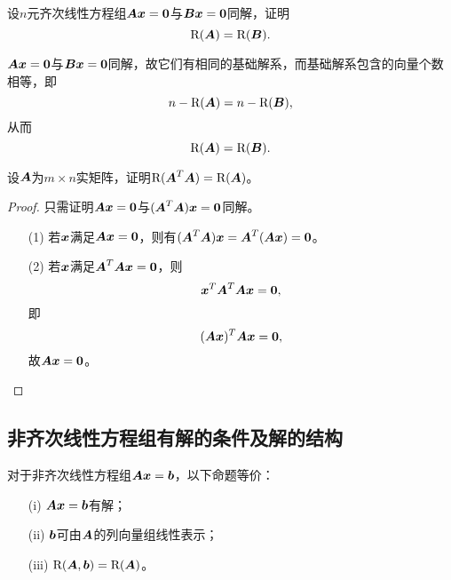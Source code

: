 \begin{frame}

  \begin{li}
    设$n$元齐次线性方程组$\A\xx=\zero$与$\B\xx=\zero$同解，证明
    $$
    \rank(\A)=\rank(\B).
    $$
  \end{li}
  \pause 
  \begin{jie}
    $\A\xx=\zero$与$\B\xx=\zero$同解，故它们有相同的基础解系，而基础解系包含的向量个数相等，即
    $$
    n-\rank(\A)=n-\rank(\B),
    $$
    从而
    $$
    \rank(\A)=\rank(\B).
    $$
  \end{jie}
\end{frame}


\begin{frame}
  \begin{li}
    设$\A$为$m\times n$实矩阵，证明$\rank(\A^T\A)=\rank(\A)$。    
  \end{li}
  \pause 
  \begin{proof}
    只需证明$\A\xx=\zero$与$(\A^T\A)\xx=\zero$同解。
    \begin{itemize}
    \item[(1)] 若$\xx$满足$\A\xx=\zero$，则有$(\A^T\A)\xx=\A^T(\A\xx)=\zero$。 
    \item[(2)] 若$\xx$满足$\A^T\A\xx=\zero$，则
      $$
      \xx^T\A^T\A\xx=\zero,
      $$
      即
      $$
      (\A\xx)^T\A\xx=\zero,
      $$
      故$\A\xx=\zero$。
    \end{itemize}
  \end{proof}
\end{frame}


\subsection{非齐次线性方程组有解的条件及解的结构}
\begin{frame}
  \begin{dingli}
    对于非齐次线性方程组$\A\xx=\bb$，以下命题等价：
    \begin{itemize}
    \item[(i)] $\A\xx=\bb$有解；
    \item[(ii)] $\bb$可由$\A$的列向量组线性表示；
    \item[(iii)] $\rank(\A,\bb)=\rank(\A)$。
    \end{itemize}
  \end{dingli}
\end{frame}


